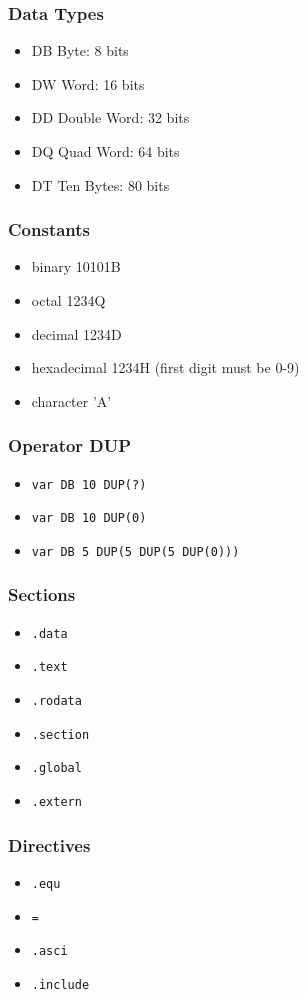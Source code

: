 \begin{frame}
    \frametitle{Data Types}
    \begin{itemize}
        \item DB Byte: 8 bits
        \item DW Word: 16 bits
        \item DD Double Word: 32 bits
        \item DQ Quad Word: 64 bits
        \item DT Ten Bytes: 80 bits
    \end{itemize}
\end{frame}

\begin{frame}
    \frametitle{Constants}
    \begin{itemize}
        \item binary 10101B
        \item octal 1234Q
        \item decimal 1234D
        \item hexadecimal 1234H (first digit must be 0-9)
        \item character 'A'
    \end{itemize}
\end{frame}

\begin{frame}
    \frametitle{Operator DUP}
    \begin{itemize}
        \item \texttt{var DB 10 DUP(?)}
        \item \texttt{var DB 10 DUP(0)}
        \item \texttt{var DB 5 DUP(5 DUP(5 DUP(0)))}
    \end{itemize}
\end{frame}

\begin{frame}
    \frametitle{Sections}
    \begin{itemize}
        \item \texttt{.data}
        \item \texttt{.text}
        \item \texttt{.rodata}
        \item \texttt{.section}
        \item \texttt{.global}
        \item \texttt{.extern}
    \end{itemize}
\end{frame}

\begin{frame}
    \frametitle{Directives}
    \begin{itemize}
        \item \texttt{.equ}
        \item \texttt{=}
        \item \texttt{.asci}
        \item \texttt{.include}
    \end{itemize}
\end{frame}


